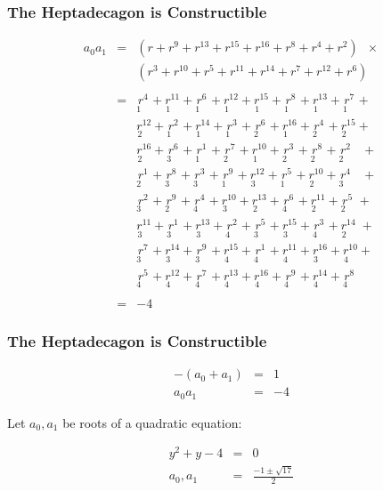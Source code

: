 \documentclass{beamer}
\newcommand*{\occ}[2]{\underset{#2\quad}{r^{#1}}}
\begin{document}
\begin{frame}
\frametitle{The Heptadecagon is Constructible}
\[
\begin{array}{lcl}
a_0a_1&=&(r + r^9 + r^{13} +r^{15} +r^{16} + r^8+r^4+r^2)\;\;\times\\
&&(r^3 + r^{10} + r^{5} +r^{11} +r^{14} + r^7+r^{12}+r^6)\\\\
&=&\occ{4}{1} + \occ{11}{1} + \occ{6}{1} + \occ{12}{1} + \occ{15}{1} + \occ{8}{1} + \occ{13}{1} + \occ{7}{1} +\\
&&\occ{12}{2} + \occ{2}{1} + \occ{14}{1} + \occ{3}{1} + \occ{6}{2} + \occ{16}{1} + \occ{4}{2} + \occ{15}{2} +\\
&&\occ{16}{2} + \occ{6}{3} + \occ{1}{1} + \occ{7}{2} + \occ{10}{1} + \occ{3}{2} + \occ{8}{2} + \occ{2}{2}\;\;\: +\\
&&\occ{1}{2} + \occ{8}{3} + \occ{3}{3} + \occ{9}{1} + \occ{12}{3} + \occ{5}{1} + \occ{10}{2} + \occ{4}{3}\;\;\: +\\
&&\occ{2}{3} + \occ{9}{2} + \occ{4}{4} + \occ{10}{3} + \occ{13}{2} + \occ{6}{4} + \occ{11}{2} + \occ{5}{2} \:+\\
&&\occ{11}{3} + \occ{1}{3} + \occ{13}{3} + \occ{2}{4} + \occ{5}{3} + \occ{15}{3} + \occ{3}{4} + \occ{14}{2} \;+\\
&&\occ{7}{3} + \occ{14}{3} + \occ{9}{3} + \occ{15}{4} + \occ{1}{4} + \occ{11}{4} + \occ{16}{3} + \occ{10}{4} +\\
&&\occ{5}{4} + \occ{12}{4} + \occ{7}{4} + \occ{13}{4} + \occ{16}{4} + \occ{9}{4} + \occ{14}{4} + \occ{8}{4}\\\\
&=&-4
\end{array}
\]

\end{frame}


\begin{frame}
\frametitle{The Heptadecagon is Constructible}


\begin{eqnarray*}
-(a_0+a_1)&=&1\\
a_0a_1&=&-4
\end{eqnarray*}

Let $a_0,a_1$ be roots of a quadratic equation:

\begin{eqnarray*}
y^2+y-4&=&0\\
a_0, a_1&=& \frac{-1\pm\sqrt{17}}{2}
\end{eqnarray*}

\end{frame}
\end{document}
